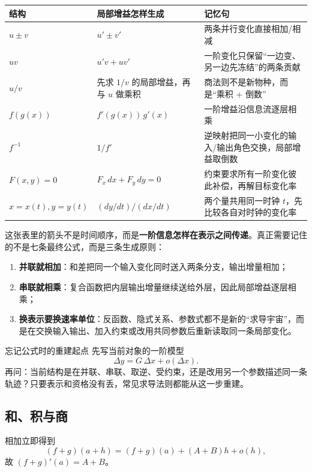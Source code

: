 \documentclass[11pt,a4paper]{ctexart}
\newcommand{\kw}[1]{\textbf{\color{deep}#1}}
\begin{document}
\begin{center}
\begin{tabularx}{\linewidth}{L{2.55cm}L{4.55cm}Y}
\toprule
\textbf{结构} & \textbf{局部增益怎样生成} & \textbf{记忆句}\\
\midrule
$u\pm v$ & $u'\pm v'$ & 两条并行变化直接相加/相减\\
$uv$ & $u'v+uv'$ & 一阶变化只保留“一边变、另一边先冻结”的两条贡献\\
$u/v$ & 先求 $1/v$ 的局部增益，再与 $u$ 做乘积 & 商法则不是新物种，而是“乘积 + 倒数”\\
$f(g(x))$ & $f'(g(x))\,g'(x)$ & 一阶增益沿信息流逐层相乘\\
$f^{-1}$ & $1/f'$ & 逆映射把同一小变化的输入/输出角色交换，局部增益取倒数\\
$F(x,y)=0$ & $F_x\,dx+F_y\,dy=0$ & 约束要求所有一阶变化彼此补偿，再解目标变化率\\
$x=x(t),y=y(t)$ & $(dy/dt)/(dx/dt)$ & 两个量共用同一时钟 $t$，先比较各自对时钟的变化率\\
\bottomrule
\end{tabularx}
\end{center}

这张表里的箭头不是时间顺序，而是\textbf{一阶信息怎样在表示之间传递}。真正需要记住的不是七条最终公式，而是三条生成原则：
\begin{enumerate}
  \item \kw{并联就相加}：和差把同一个输入变化同时送入两条分支，输出增量相加；
  \item \kw{串联就相乘}：复合函数把内层输出增量继续送给外层，因此局部增益逐层相乘；
  \item \kw{换表示要换速率单位}：反函数、隐式关系、参数式都不是新的“求导宇宙”，而是在交换输入输出、加入约束或改用共同参数后重新读取同一条局部变化。
\end{enumerate}

\begin{corebox}{忘记公式时的重建起点}
先写当前对象的一阶模型
\[
\Delta y=G\,\Delta x+o(\Delta x).
\]
再问：当前结构是在并联、串联、取逆、受约束，还是改用另一个参数描述同一条轨迹？只要表示和资格没有丢，常见求导法则都能从这一步重建。
\end{corebox}

\subsection{和、积与商}

相加立即得到
\[
(f+g)(a+h)=(f+g)(a)+(A+B)h+o(h),
\]
故 $(f+g)'(a)=A+B$。
\end{document}
